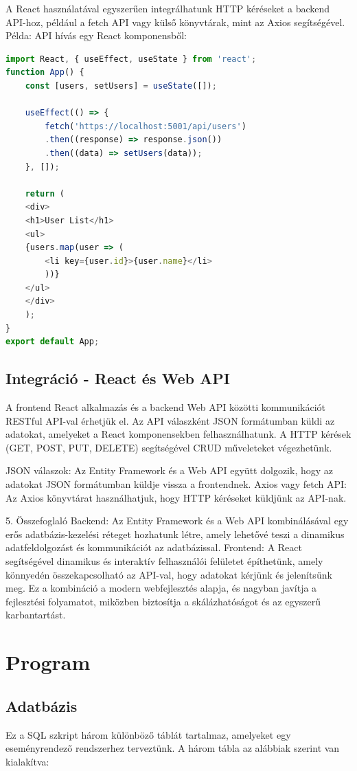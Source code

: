 \documentclass[colorlinks]{thesis-kando}
\theoremstyle{definition}
\theoremstyle{remark}
\begin{document}
A React használatával egyszerűen integrálhatunk HTTP kéréseket a backend API-hoz, például a fetch API vagy külső könyvtárak, mint az Axios segítségével.
Példa: API hívás egy React komponensből:
\begin{lstlisting}[language=JavaScript]
import React, { useEffect, useState } from 'react';
function App() {
	const [users, setUsers] = useState([]);
	
	useEffect(() => {
		fetch('https://localhost:5001/api/users')
		.then((response) => response.json())
		.then((data) => setUsers(data));
	}, []);
	
	return (
	<div>
	<h1>User List</h1>
	<ul>
	{users.map(user => (
		<li key={user.id}>{user.name}</li>
		))}
	</ul>
	</div>
	);
}
export default App;
\end{lstlisting}
\section {Integráció - React és Web API}
A frontend React alkalmazás és a backend Web API közötti kommunikációt RESTful API-val érhetjük el. Az API válaszként JSON formátumban küldi az adatokat, amelyeket a React komponensekben felhasználhatunk. A HTTP kérések (GET, POST, PUT, DELETE) segítségével CRUD műveleteket végezhetünk.

JSON válaszok: Az Entity Framework és a Web API együtt dolgozik, hogy az adatokat JSON formátumban küldje vissza a frontendnek.
Axios vagy fetch API: Az Axios könyvtárat használhatjuk, hogy HTTP kéréseket küldjünk az API-nak.
\par
5. Összefoglaló
Backend: Az Entity Framework és a Web API kombinálásával egy erős adatbázis-kezelési réteget hozhatunk létre, amely lehetővé teszi a dinamikus adatfeldolgozást és kommunikációt az adatbázissal.
Frontend: A React segítségével dinamikus és interaktív felhasználói felületet építhetünk, amely könnyedén összekapcsolható az API-val, hogy adatokat kérjünk és jelenítsünk meg.
Ez a kombináció a modern webfejlesztés alapja, és nagyban javítja a fejlesztési folyamatot, miközben biztosítja a skálázhatóságot és az egyszerű karbantartást.
\chapter{Program}

\section{Adatbázis}
Ez a SQL szkript három különböző táblát tartalmaz, amelyeket egy eseményrendező rendszerhez terveztünk. A három tábla az alábbiak szerint van kialakítva:
\end{document}
